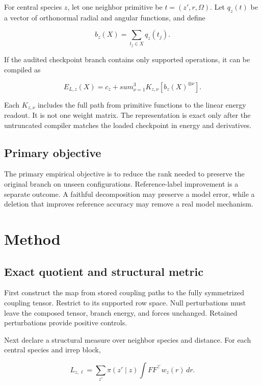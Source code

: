 \documentclass[10pt,twocolumn]{article}
\begin{document}
For central species $z$, let one neighbor primitive be $t=(z',r,\Omega)$. Let $q_z(t)$ be a vector of orthonormal radial and angular functions, and define

\begin{equation}
b_z(X)=\sum_{t_j\in X}q_z(t_j).
\label{eq:aggregate}
\end{equation}

If the audited checkpoint branch contains only supported operations, it can be compiled as

\begin{equation}
E_{L,z}(X)=c_z+sum_{\nu=1}^{3}
K_{z,\nu}\left[b_z(X)^{\otimes\nu}\right].
\label{eq:branch}
\end{equation}

Each $K_{z,\nu}$ includes the full path from primitive functions to the linear energy readout. It is not one weight matrix. The representation is exact only after the untruncated compiler matches the loaded checkpoint in energy and derivatives.

\subsection{Primary objective}

The primary empirical objective is to reduce the rank needed to preserve the original branch on unseen configurations. Reference-label improvement is a separate outcome. A faithful decomposition may preserve a model error, while a deletion that improves reference accuracy may remove a real model mechanism.

\section{Method}

\subsection{Exact quotient and structural metric}

First construct the map from stored coupling paths to the fully symmetrized coupling tensor. Restrict to its supported row space. Null perturbations must leave the composed tensor, branch energy, and forces unchanged. Retained perturbations provide positive controls.

Next declare a structural measure over neighbor species and distance. For each central species and irrep block,

\begin{equation}
L_{z,\ell}=\sum_{z'}\pi(z'\mid z)
\int F F^\top w_z(r)\,dr.
\label{eq:metric}
\end{equation}
\end{document}
